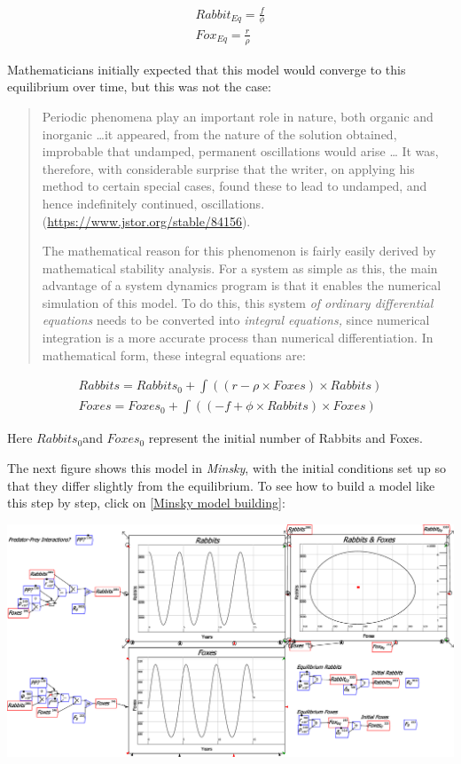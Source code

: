 \[
\begin{array}{c}
Rabbit_{Eq}=\frac{f}{\phi}\\
Fox_{Eq}=\frac{r}{\rho}
\end{array}
\]

Mathematicians initially expected that this model would converge to
this equilibrium over time, but this was not the case:
\begin{quotation}
Periodic phenomena play an important role in nature, both organic
and inorganic \ldots it appeared, from the nature of the solution
obtained, improbable that undamped, permanent oscillations would arise
\ldots{} It was, therefore, with considerable surprise that the writer,
on applying his method to certain special cases, found these to lead
to undamped, and hence indefinitely continued, oscillations. (\url{https://www.jstor.org/stable/84156}).

The mathematical reason for this phenomenon is fairly easily derived
by mathematical stability analysis. For a system as simple as this,
the main advantage of a system dynamics program is that it enables
the numerical simulation of this model. To do this, this system \emph{of
ordinary differential equations} needs to be converted into \emph{integral
equations,} since numerical integration is a more accurate process
than numerical differentiation. In mathematical form, these integral
equations are:
\end{quotation}
\[
\begin{array}{c}
Rabbits=Rabbits_{0}+\int\left(\left(r-\rho\times Foxes\right)\times Rabbits\right)\\
Foxes=Foxes_{0}+\int\left(\left(-f+\phi\times Rabbits\right)\times Foxes\right)
\end{array}
\]

Here $Rabbits_{0}$and $Foxes_{0}$ represent the initial number of
Rabbits and Foxes.

The next figure shows this model in \emph{Minsky}, with the initial
conditions set up so that they differ slightly from the equilibrium.
To see how to build a model like this step by step, click on \ref{Minsky model building}:

\includegraphics[width=15cm]{images/PredatorPreyRabbitsFoxes}

